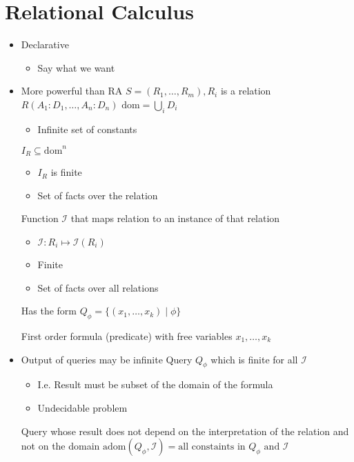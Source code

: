 \section{Relational Calculus}
\begin{itemize}
    \item Declarative
        \begin{itemize}
            \item Say what we want
        \end{itemize}
    \item More powerful than RA
     $S = (R_1, \dots, R_m), R_i$ is a relation
     $R(A_1:D_1, \dots , A_n:D_n)$
     $\text{dom} = \bigcup_i D_i$
        \begin{itemize}
            \item Infinite set of constants
        \end{itemize}
     $I_R \subseteq \text{dom}^n$
        \begin{itemize}
            \item $I_R$ is finite
            \item Set of facts over the relation
        \end{itemize}
     Function $\mathcal{I}$ that maps relation to an instance of that relation
        \begin{itemize}
            \item $\mathcal{I}: R_i \mapsto \mathcal{I}(R_i)$
            \item Finite
            \item Set of facts over all relations
        \end{itemize}
     Has the form $Q_\phi = \{(x_1, \dots, x_k) \mid \phi\}$
        \begin{itemize}
            \ides{$\mathbf{\phi}$:} First order formula (predicate) with free variables $x_1, \dots, x_k$ 
        \end{itemize} 
    \item Output of queries may be infinite
     Query $Q_\phi$ which is finite for all $\mathcal{I}$
        \begin{itemize}
            \item I.e. Result must be subset of the domain of the formula
            \item Undecidable problem
        \end{itemize}
     Query whose result does not depend on the interpretation of the relation and not on the domain
     $\text{adom}(Q_\phi, \mathcal{I}) = \text{all constaints in } Q_\phi \text{ and } \mathcal{I}$
\end{itemize}

